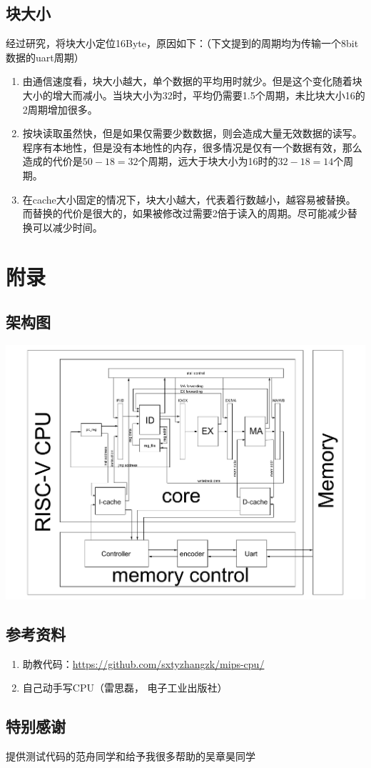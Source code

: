 \documentclass[11pt, a4paper]{article}
\begin{document}
  \subsection{块大小}
  经过研究，将块大小定位16Byte，原因如下：（下文提到的周期均为传输一个8bit数据的uart周期）
  \begin{enumerate}
  	\item 由通信速度看，块大小越大，单个数据的平均用时就少。但是这个变化随着块大小的增大而减小。当块大小为32时，平均仍需要1.5个周期，未比块大小16的2周期增加很多。
  	\item 按块读取虽然快，但是如果仅需要少数数据，则会造成大量无效数据的读写。程序有本地性，但是没有本地性的内存，很多情况是仅有一个数据有效，那么造成的代价是$50-18=32$个周期，远大于块大小为16时的$32-18=14$个周期。
  	\item 在cache大小固定的情况下，块大小越大，代表着行数越小，越容易被替换。而替换的代价是很大的，如果被修改过需要2倍于读入的周期。尽可能减少替换可以减少时间。
  \end{enumerate}
  
\section{附录}
	\subsection{架构图}
		\includegraphics[width=6.5in]{cpu}
	\subsection{参考资料}
		\begin{enumerate}
			\item 助教代码：\url{https://github.com/sxtyzhangzk/mips-cpu/}
			\item 自己动手写CPU（雷思磊， 电子工业出版社）
		\end{enumerate}	
	\subsection{特别感谢}
		提供测试代码的范舟同学和给予我很多帮助的吴章昊同学
\end{document}
